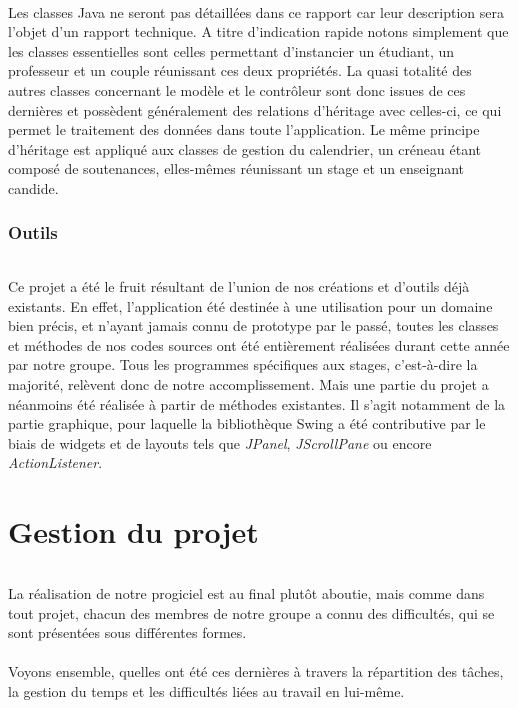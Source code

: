 \documentclass[a4paper,10pt]{report}
\begin{document}
      \paragraph{}
	Les classes Java ne seront pas détaillées dans ce rapport car leur description sera l'objet d'un rapport technique.
	A titre d'indication rapide notons simplement que les classes essentielles sont celles permettant d'instancier un étudiant, un professeur et un couple réunissant ces deux propriétés.
	La quasi totalité des autres classes concernant le modèle et le contrôleur sont donc issues de ces dernières et possèdent généralement des relations d'héritage avec celles-ci, ce qui permet le traitement des données dans toute l'application.
	Le même principe d'héritage est appliqué aux classes de gestion du calendrier, un créneau étant composé de soutenances, elles-mêmes réunissant un stage et un enseignant candide.
	
	
	
    \section{Outils}
      \paragraph{}
	Ce projet a été le fruit résultant de l'union de nos créations et d'outils déjà existants. 
	En effet, l'application été destinée à une utilisation pour un domaine bien précis, et n'ayant jamais connu de prototype par le passé, toutes les classes et méthodes de nos codes sources ont été entièrement réalisées durant cette année par notre groupe.
	Tous les programmes spécifiques aux stages, c'est-à-dire la majorité, relèvent donc de notre accomplissement.
	Mais une partie du projet a néanmoins été réalisée à partir de méthodes existantes. 
	Il s'agit notamment de la partie graphique, pour laquelle la bibliothèque Swing a été contributive par le biais de widgets et de layouts tels que \textit{JPanel}, \textit{JScrollPane} ou encore \textit{ActionListener}.
	
	
		
\part{Gestion du projet}
\setcounter{chapter}{0}
      \paragraph{}
	  La réalisation de notre progiciel est au final plutôt aboutie, mais comme dans tout projet, chacun des membres de notre groupe a connu des difficultés, qui se sont présentées sous différentes formes.
	  ~\\~\\
	  Voyons ensemble, quelles ont été ces dernières à travers la répartition des tâches, la gestion du temps et les difficultés liées au travail en lui-même.
	
\end{document}
